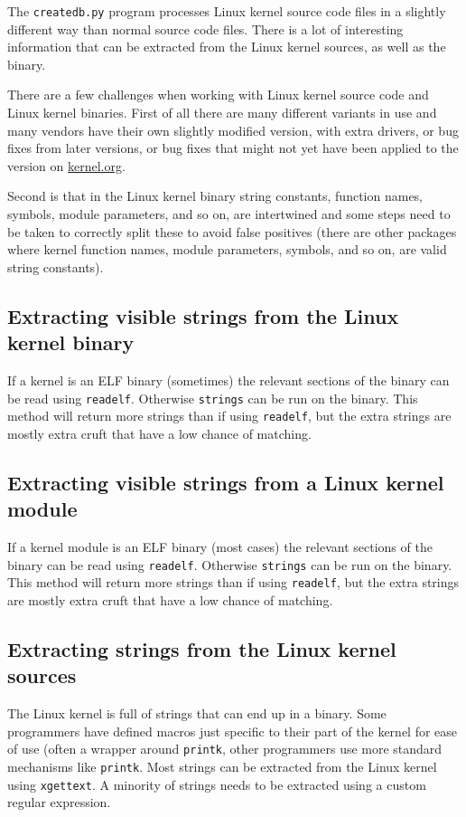 \documentclass[10pt]{article}
\begin{document}
The \texttt{createdb.py} program processes Linux kernel source code files in a
slightly different way than normal source code files. There is a lot of
interesting information that can be extracted from the Linux kernel sources,
as well as the binary.

There are a few challenges when working with Linux kernel source code and Linux
kernel binaries. First of all there are many different variants in use and many
vendors have their own slightly modified version, with extra drivers, or bug
fixes from later versions, or bug fixes that might not yet have been applied to
the version on \url{kernel.org}.

Second is that in the Linux kernel binary string constants, function names,
symbols, module parameters, and so on, are intertwined and some steps need to
be taken to correctly split these to avoid false positives (there are other
packages where kernel function names, module parameters, symbols, and so on,
are valid string constants).

\subsection{Extracting visible strings from the Linux kernel binary}

If a kernel is an ELF binary (sometimes) the relevant sections of the
binary can be read using \texttt{readelf}. Otherwise \texttt{strings} can be
run on the binary. This method will return more strings than if using
\texttt{readelf}, but the extra strings are mostly extra cruft that have a low
chance of matching.

\subsection{Extracting visible strings from a Linux kernel module}

If a kernel module is an ELF binary (most cases) the relevant sections of the
binary can be read using \texttt{readelf}. Otherwise \texttt{strings} can be
run on the binary. This method will return more strings than if using
\texttt{readelf}, but the extra strings are mostly extra cruft that have a low
chance of matching.

\subsection{Extracting strings from the Linux kernel sources}

The Linux kernel is full of strings that can end up in a binary. Some
programmers have defined macros just specific to their part of the kernel for
ease of use (often a wrapper around \texttt{printk}, other programmers use
more standard mechanisms like \texttt{printk}. Most strings can be extracted
from the Linux kernel using \texttt{xgettext}. A minority of strings needs to
be extracted using a custom regular expression.
\end{document}

